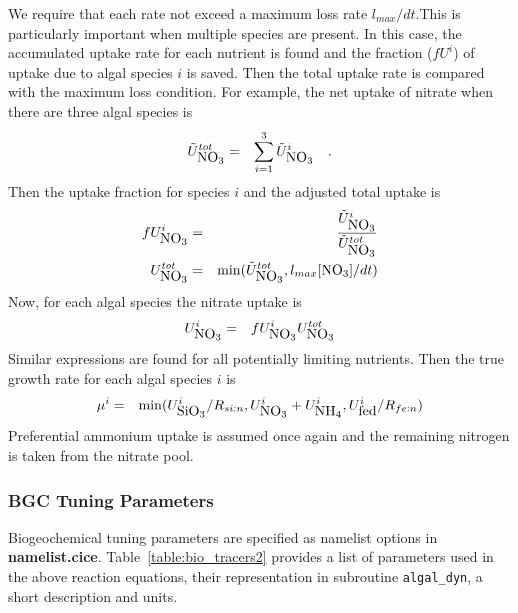 We require that each rate not exceed a maximum loss rate
$l_{max}/dt$.This is particularly important when multiple species are present.
In this case, the accumulated uptake rate for each nutrient is found and the fraction ($fU^i$) of uptake due to algal species $i$ is
saved. Then the total uptake rate is compared with the maximum loss
condition.
For example, the net uptake of nitrate when there are three algal species is
\begin{eqnarray}
\tilde{U}^{tot}_{\mbox{NO$_3$}} & = & \sum^{3}_{i=1}\tilde{U}^i_{\mbox{NO$_3$}}\ \ \ . \nonumber
\end{eqnarray}
Then the uptake fraction for species $i$ and the adjusted total uptake is
\begin{eqnarray}
fU^i_{\mbox{NO$_3$}} & = & \frac{\tilde{U}^i_{\mbox{NO$_3$}}}{\tilde{U}^{tot}_{\mbox{NO$_3$}}} \nonumber \\
U^{tot}_{\mbox{NO$_3$}} & = & \min(\tilde{U}^{tot}_{\mbox{NO$_3$}}, l_{max}[\mbox{NO$_3$}]/dt)
\end{eqnarray}
Now, for each algal species the nitrate uptake is
\begin{eqnarray}
U^i_{\mbox{NO$_3$}} & = & fU^i_{\mbox{NO$_3$}} U^{tot}_{\mbox{NO$_3$}}
\end{eqnarray}
Similar expressions are found for all potentially limiting nutrients.
Then the true growth rate for each algal species $i$ is
\begin{eqnarray}
\mu^i & = & \min(U^i_{\mbox{SiO$_3$}}/R_{si:n}, U^i_{\mbox{NO$_3$}} + U^i_{\mbox{NH$_4$}}, U^i_{\mbox{fed}}/R_{fe:n})
\end{eqnarray}
Preferential ammonium uptake is assumed once again and the remaining nitrogen
is taken from the nitrate pool.

\subsubsection{BGC Tuning Parameters}
Biogeochemical tuning parameters are specified as namelist options in
{\bf namelist.cice}.  Table~\ref{table:bio_tracers2} provides a list of
parameters used in the above reaction equations, their representation in subroutine
{\tt algal\_dyn}, a short description and units.

